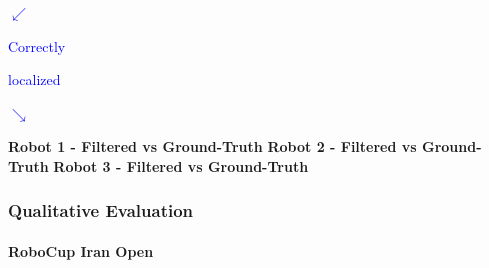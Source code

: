 \begin{frame}
	\vspace{-1.17cm}
	
	\begin{tabbing}
		\footnotesize
		\hspace{7cm}
		\textcolor{blue}{$ \swarrow $}
	\end{tabbing}
	
	\vspace{-1.79cm}
	
	\begin{tabbing}
		\hspace{9.52cm}
		\tiny
		\textcolor{blue}{Correctly}
	\end{tabbing}
	
	\vspace{-1.2cm}
	
	\begin{tabbing}
		\hspace{9.54cm}
		\tiny
		\textcolor{blue}{localized}
	\end{tabbing}
	
	\vspace{-1.17cm}
	
	\begin{tabbing}
		\footnotesize
		\hspace{9.99cm}
		\textcolor{blue}{$ \searrow $}
	\end{tabbing}
	
	\vspace{0.01cm}
	
	\begin{tabbing}
		\hspace{0.21cm}
		\tiny
		\textbf{Robot 1 - Filtered vs Ground-Truth}
		\hspace{0.53cm}
		\textbf{Robot 2 - Filtered vs Ground-Truth}
		\hspace{0.53cm}
		\textbf{Robot 3 - Filtered vs Ground-Truth}
	\end{tabbing}
\end{frame}

\begin{frame}
	\frametitle{Qualitative Evaluation}
	\framesubtitle{RoboCup Iran Open}
	
	\begin{figure}[!h]
		\centering
	\end{figure}
\end{frame}


